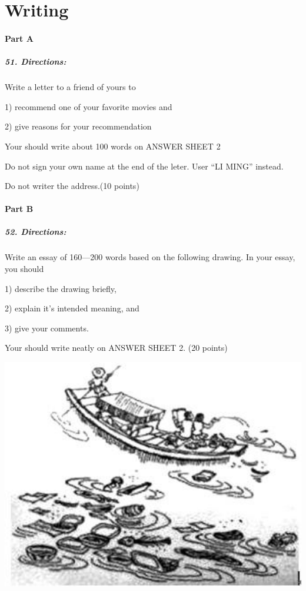 \section{Writing}
\paragraph{Part A}
\subparagraph{51. Directions:}

Write a letter to a friend of yours to

1) recommend one of your favorite movies and

2) give reasons for your recommendation

Your should write about 100 words on ANSWER SHEET 2

Do not sign your own name at the end of the leter. User “LI MING” instead.

Do not writer the address.(10 points)

\paragraph{Part B}
\subparagraph{52. Directions:}

Write an essay of 160---200 words based on the following drawing. In your essay, you should

1) describe the drawing briefly,

2) explain it’s intended meaning, and

3) give your comments.

Your should write neatly on ANSWER SHEET 2. (20 points)

\includegraphics[width=14cm]{8.jpg}
